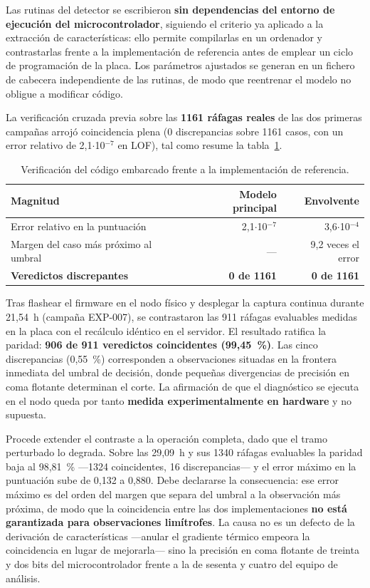 Las rutinas del detector se escribieron \textbf{sin dependencias del entorno de ejecución del
microcontrolador}, siguiendo el criterio ya aplicado a la extracción de características: ello
permite compilarlas en un ordenador y contrastarlas frente a la implementación de referencia
antes de emplear un ciclo de programación de la placa. Los parámetros ajustados se generan en un
fichero de cabecera independiente de las rutinas, de modo que reentrenar el modelo no obligue a
modificar código.

La verificación cruzada previa sobre las \textbf{1161 ráfagas reales} de las dos primeras
campañas arrojó coincidencia plena (0 discrepancias sobre 1161 casos, con un error relativo de
\mbox{2,1$\cdot$10$^{-7}$} en LOF), tal como resume la tabla~\ref{table:verificacion-nodo}.

\begin{table}[ht!]
\caption{Verificación del código embarcado frente a la implementación de referencia.}
\label{table:verificacion-nodo}
\centering
\begin{tabular}{|p{5.6cm}|r|r|}
\hline
\textbf{Magnitud} & \textbf{Modelo principal} & \textbf{Envolvente} \\
\hline
Error relativo en la puntuación & \mbox{2,1$\cdot$10$^{-7}$} & \mbox{3,6$\cdot$10$^{-4}$} \\
\hline
Margen del caso más próximo al umbral & --- & 9,2 veces el error \\
\hline
\textbf{Veredictos discrepantes} & \textbf{0 de 1161} & \textbf{0 de 1161} \\
\hline
\end{tabular}
\end{table}

Tras flashear el firmware en el nodo físico y desplegar la captura continua durante
\mbox{21,54 h} (campaña EXP-007), se contrastaron las 911 ráfagas evaluables medidas en la placa
con el recálculo idéntico en el servidor. El resultado ratifica la paridad: \textbf{906 de 911
veredictos coincidentes (99,45~\%)}. Las cinco discrepancias (0,55~\%) corresponden a
observaciones situadas en la frontera inmediata del umbral de decisión, donde pequeñas
divergencias de precisión en coma flotante determinan el corte. La afirmación de que el
diagnóstico se ejecuta en el nodo queda por tanto \textbf{medida experimentalmente en hardware}
y no supuesta.

Procede extender el contraste a la operación completa, dado que el tramo perturbado lo degrada.
Sobre las \mbox{29,09 h} y sus 1340 ráfagas evaluables la paridad baja al \mbox{98,81 \%} —1324
coincidentes, 16 discrepancias— y el error máximo en la puntuación sube de \mbox{0,132} a
\mbox{0,880}. Debe declararse la consecuencia: ese error máximo es del orden del margen que
separa del umbral a la observación más próxima, de modo que la coincidencia entre las dos
implementaciones \textbf{no está garantizada para observaciones limítrofes}. La causa no es un
defecto de la derivación de características —anular el gradiente térmico empeora la coincidencia
en lugar de mejorarla— sino la precisión en coma flotante de treinta y dos bits del
microcontrolador frente a la de sesenta y cuatro del equipo de análisis.

